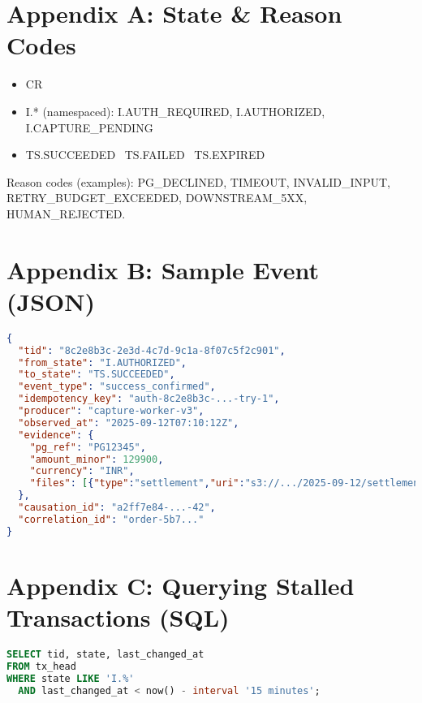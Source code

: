 \documentclass[11pt]{article}
\begin{document}
\appendix
\section{Appendix A: State \& Reason Codes}
\begin{itemize}[leftmargin=*]
\item CR
\item I.* (namespaced): I.AUTH\_REQUIRED, I.AUTHORIZED, I.CAPTURE\_PENDING
\item TS.SUCCEEDED \textbar\ TS.FAILED \textbar\ TS.EXPIRED
\end{itemize}
Reason codes (examples): PG\_DECLINED, TIMEOUT, INVALID\_INPUT, RETRY\_BUDGET\_EXCEEDED, DOWNSTREAM\_5XX, HUMAN\_REJECTED.

\section{Appendix B: Sample Event (JSON)}
\begin{lstlisting}[language=json]
{
  "tid": "8c2e8b3c-2e3d-4c7d-9c1a-8f07c5f2c901",
  "from_state": "I.AUTHORIZED",
  "to_state": "TS.SUCCEEDED",
  "event_type": "success_confirmed",
  "idempotency_key": "auth-8c2e8b3c-...-try-1",
  "producer": "capture-worker-v3",
  "observed_at": "2025-09-12T07:10:12Z",
  "evidence": {
    "pg_ref": "PG12345",
    "amount_minor": 129900,
    "currency": "INR",
    "files": [{"type":"settlement","uri":"s3://.../2025-09-12/settlement.csv"}]
  },
  "causation_id": "a2ff7e84-...-42",
  "correlation_id": "order-5b7..."
}
\end{lstlisting}

\section{Appendix C: Querying Stalled Transactions (SQL)}
\begin{lstlisting}[language=SQL]
SELECT tid, state, last_changed_at
FROM tx_head
WHERE state LIKE 'I.%'
  AND last_changed_at < now() - interval '15 minutes';
\end{lstlisting}
\end{document}
